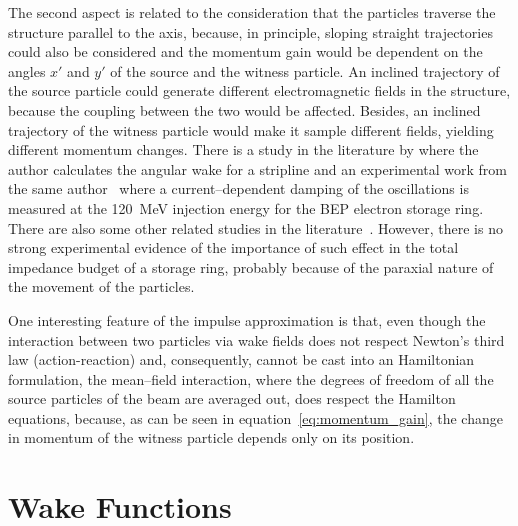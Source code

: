     The second aspect is related to the consideration that the particles traverse the structure parallel to the axis, because, in principle, sloping straight trajectories could also be considered and the momentum gain would be dependent on the angles $x'$ and $y'$ of the source and the witness particle. An inclined trajectory of the source particle could generate different electromagnetic fields in the structure, because the coupling between the two would be affected. Besides, an inclined trajectory of the witness particle would make it sample different fields, yielding different momentum changes. There is a study in the literature by  where the author calculates the angular wake for a stripline and an experimental work from the same author~\cite{Danilov1993} where a current--dependent damping of the oscillations is measured at the \SI{120}{\mega\electronvolt} injection energy for the BEP electron storage ring. There are also some other related studies in the literature~\cite{Jones1998}. However, there is no strong experimental evidence of the importance of such effect in the total impedance budget of a storage ring, probably because of the paraxial nature of the movement of the particles.

    One interesting feature of the impulse approximation is that, even though the interaction between two particles via wake fields does not respect Newton's third law (action-reaction) and, consequently, cannot be cast into an Hamiltonian formulation, the mean--field interaction, where the degrees of freedom of all the source particles of the beam are averaged out, does respect the Hamilton equations, because, as can be seen in equation~\eqref{eq:momentum_gain}, the change in momentum of the witness particle depends only on its position.

\section{Wake Functions}\label{sec:wake_functions}

